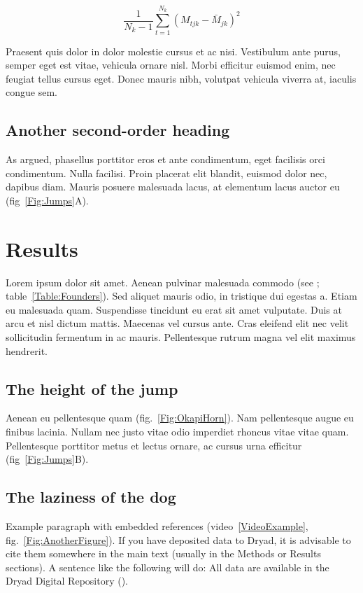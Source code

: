 \documentclass[11pt]{article}
\begin{document}
	\begin{equation}
	{ \frac{1}{N_k-1} \sum \limits_{t=1}^{N_k} (M_{tjk} - \bar{M}_{jk})^2}
	\end{equation}
	
	Praesent quis dolor in dolor molestie cursus et ac nisi. Vestibulum ante purus, semper eget est vitae, vehicula ornare nisl. Morbi efficitur euismod enim, nec feugiat tellus cursus eget. Donec mauris nibh, volutpat vehicula viverra at, iaculis congue sem.
	
	\subsection*{Another second-order heading}
	
	As \citet{Xiao2015} argued, phasellus porttitor eros et ante condimentum, eget facilisis orci condimentum. Nulla facilisi. Proin placerat elit blandit, euismod dolor nec, dapibus diam. Mauris posuere malesuada lacus, at elementum lacus auctor eu (fig~\ref{Fig:Jumps}A). 
	
	\section*{Results}
	
	Lorem ipsum dolor sit amet. Aenean pulvinar malesuada commodo (see \citealt{DavisEtAl2011}; table~\ref{Table:Founders}). Sed aliquet mauris odio, in tristique dui egestas a. Etiam eu malesuada quam. Suspendisse tincidunt eu erat sit amet vulputate. Duis at arcu et nisl dictum mattis. Maecenas vel cursus ante. Cras eleifend elit nec velit sollicitudin fermentum in ac mauris. Pellentesque rutrum magna vel elit maximus hendrerit. 
	
	\subsection*{The height of the jump}
	
	Aenean eu pellentesque quam (fig.~\ref{Fig:OkapiHorn}). Nam pellentesque augue eu finibus lacinia. Nullam nec justo vitae odio imperdiet rhoncus vitae vitae quam. Pellentesque porttitor metus et lectus ornare, ac cursus urna efficitur (fig~\ref{Fig:Jumps}B). 
	
	\subsection*{The laziness of the dog}
	
	Example paragraph with embedded references (video~\ref{VideoExample}, fig.~\ref{Fig:AnotherFigure}). 
	If you have deposited data to Dryad, it is advisable to cite them somewhere in the main text (usually in the Methods or Results sections). A sentence like the following will do: All data are available in the Dryad Digital Repository (\citealt{CookEtAl2015}).
	
\end{document}
